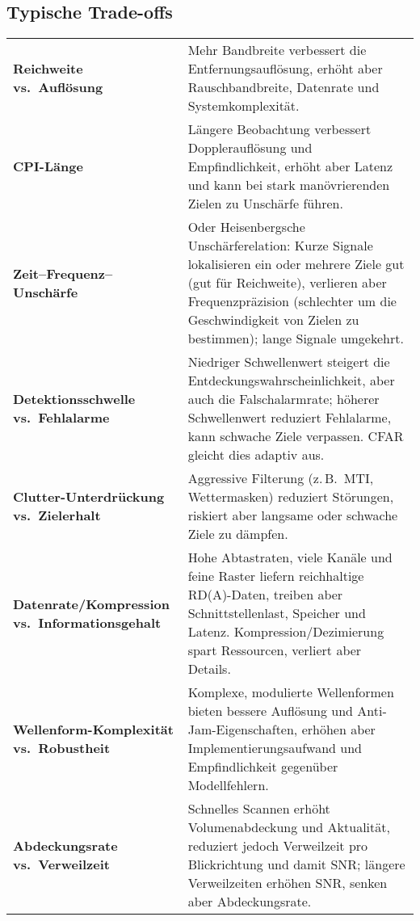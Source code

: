 \subsection{Typische Trade-offs}
\begin{tabular}{p{} p{}}
\textbf{Reichweite vs.\ Auflösung} & Mehr Bandbreite verbessert die Entfernungsauflösung, erhöht aber Rauschbandbreite, Datenrate und Systemkomplexität. \\[0.5em]
\textbf{CPI-Länge} & Längere Beobachtung verbessert Dopplerauflösung und Empfindlichkeit, erhöht aber Latenz und kann bei stark manövrierenden Zielen zu Unschärfe führen. \\[0.5em]
\textbf{Zeit–Frequenz–Unschärfe} & Oder Heisenbergsche Unschärferelation: Kurze Signale lokalisieren ein oder mehrere Ziele gut (gut für Reichweite), verlieren aber Frequenzpräzision (schlechter um die Geschwindigkeit von Zielen zu bestimmen); lange Signale umgekehrt. \\[0.5em]
\textbf{Detektionsschwelle vs.\ Fehlalarme} & Niedriger Schwellenwert steigert die Entdeckungswahrscheinlichkeit, aber auch die Falschalarmrate; höherer Schwellenwert reduziert Fehlalarme, kann schwache Ziele verpassen. CFAR gleicht dies adaptiv aus. \\[0.5em]
\textbf{Clutter-Unterdrückung vs.\ Zielerhalt} & Aggressive Filterung (z.\,B.\ MTI, Wettermasken) reduziert Störungen, riskiert aber langsame oder schwache Ziele zu dämpfen. \\[0.5em]
\textbf{Datenrate/Kompression vs.\ Informationsgehalt} & Hohe Abtastraten, viele Kanäle und feine Raster liefern reichhaltige RD(A)-Daten, treiben aber Schnittstellenlast, Speicher und Latenz. Kompression/Dezimierung spart Ressourcen, verliert aber Details. \\[0.5em]
\textbf{Wellenform-Komplexität vs.\ Robustheit} & Komplexe, modulierte Wellenformen bieten bessere Auflösung und Anti-Jam-Eigenschaften, erhöhen aber Implementierungsaufwand und Empfindlichkeit gegenüber Modellfehlern. \\[0.5em]
\textbf{Abdeckungsrate vs.\ Verweilzeit} & Schnelles Scannen erhöht Volumenabdeckung und Aktualität, reduziert jedoch Verweilzeit pro Blickrichtung und damit SNR; längere Verweilzeiten erhöhen SNR, senken aber Abdeckungsrate. \\
\end{tabular}

